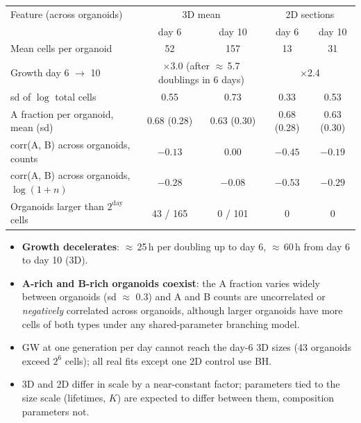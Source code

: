\documentclass[10pt,a4paper]{article}
\newcommand{\blk}[1]{\par\needspace{5\baselineskip}\smallskip{\sffamily\bfseries\color{inkgray}#1}\par}
\newcommand{\Comment}{\blk{Comment}}
\begin{document}
\begin{center}\footnotesize
\begin{tabular}{@{}lcccc@{}}\toprule
Feature (across organoids) & \multicolumn{2}{c}{3D mean} & \multicolumn{2}{c}{2D sections} \\
 & day 6 & day 10 & day 6 & day 10 \\\midrule
Mean cells per organoid & 52 & 157 & 13 & 31 \\
Growth day 6 $\to$ 10 & \multicolumn{2}{c}{$\times$3.0 (after $\approx$\,5.7 doublings in 6 days)} & \multicolumn{2}{c}{$\times$2.4} \\
sd of $\log$ total cells & 0.55 & 0.73 & 0.33 & 0.53 \\
A fraction per organoid, mean (sd) & 0.68 (0.28) & 0.63 (0.30) & 0.68 (0.28) & 0.63 (0.30) \\
corr(A, B) across organoids, counts & $-0.13$ & 0.00 & $-0.45$ & $-0.19$ \\
corr(A, B) across organoids, $\log(1+n)$ & $-0.28$ & $-0.08$ & $-0.53$ & $-0.29$ \\
Organoids larger than $2^{\text{day}}$ cells & 43 / 165 & 0 / 101 & 0 & 0 \\\bottomrule
\end{tabular}
\end{center}
\Comment
\begin{itemize}
\item \textbf{Growth decelerates}: $\approx$\,25\,h per doubling up to day 6, $\approx$\,60\,h from day 6 to day 10 (3D).
\item \textbf{A-rich and B-rich organoids coexist}: the A fraction varies widely between organoids (sd $\approx$ 0.3) and A and B counts are uncorrelated or \emph{negatively} correlated across organoids, although larger organoids have more cells of both types under any shared-parameter branching model.
\item GW at one generation per day cannot reach the day-6 3D sizes (43 organoids exceed $2^6$ cells); all real fits except one 2D control use BH.
\item 3D and 2D differ in scale by a near-constant factor; parameters tied to the size scale (lifetimes, $K$) are expected to differ between them, composition parameters not.
\end{itemize}

\end{document}

